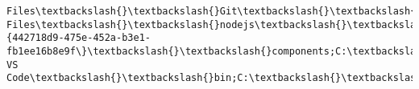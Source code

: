\documentclass[11pt]{article}
\begin{document}
\begin{Verbatim}[commandchars=\\\{\}]
Files\textbackslash{}\textbackslash{}Git\textbackslash{}\textbackslash{}cmd;C:\textbackslash{}\textbackslash{}WINDOWS\textbackslash{}\textbackslash{}System32\textbackslash{}\textbackslash{}OpenSSH\textbackslash{}\textbackslash{};C:\textbackslash{}\textbackslash{}Program Files\textbackslash{}\textbackslash{}nodejs\textbackslash{}\textbackslash{};C:\textbackslash{}\textbackslash{}ProgramData\textbackslash{}\textbackslash{}chocolatey\textbackslash{}\textbackslash{}bin;C:\textbackslash{}\textbackslash{}xampp\textbackslash{}\textbackslash{}php;C:\textbackslash{}\textbackslash{}ProgramData\textbackslash{}\textbackslash{}ComposerSetup\textbackslash{}\textbackslash{}bin;C:\textbackslash{}\textbackslash{}Users\textbackslash{}\textbackslash{}muham\textbackslash{}\textbackslash{}AppData\textbackslash{}\textbackslash{}Local\textbackslash{}\textbackslash{}Microsoft\textbackslash{}\textbackslash{}WindowsApps;C:\textbackslash{}\textbackslash{}Users\textbackslash{}\textbackslash{}muham\textbackslash{}\textbackslash{}AppData\textbackslash{}\textbackslash{}Roaming\textbackslash{}\textbackslash{}Dashlane\textbackslash{}\textbackslash{}4.8.2.33026\textbackslash{}\textbackslash{}bin\textbackslash{}\textbackslash{}Firefox\_Extension\textbackslash{}\textbackslash{}\{442718d9-475e-452a-b3e1-fb1ee16b8e9f\}\textbackslash{}\textbackslash{}components;C:\textbackslash{}\textbackslash{}Users\textbackslash{}\textbackslash{}muham\textbackslash{}\textbackslash{}AppData\textbackslash{}\textbackslash{}Roaming\textbackslash{}\textbackslash{}Dashlane\textbackslash{}\textbackslash{}4.8.2.33026\textbackslash{}\textbackslash{}ucrt;C:\textbackslash{}\textbackslash{}Users\textbackslash{}\textbackslash{}muham\textbackslash{}\textbackslash{}AppData\textbackslash{}\textbackslash{}Local\textbackslash{}\textbackslash{}atom\textbackslash{}\textbackslash{}bin;C:\textbackslash{}\textbackslash{}Users\textbackslash{}\textbackslash{}muham\textbackslash{}\textbackslash{}AppData\textbackslash{}\textbackslash{}Local\textbackslash{}\textbackslash{}GitHubDesktop\textbackslash{}\textbackslash{}bin;C:\textbackslash{}\textbackslash{}Users\textbackslash{}\textbackslash{}muham\textbackslash{}\textbackslash{}AppData\textbackslash{}\textbackslash{}Local\textbackslash{}\textbackslash{}Microsoft\textbackslash{}\textbackslash{}WindowsApps;;C:\textbackslash{}\textbackslash{}Users\textbackslash{}\textbackslash{}muham\textbackslash{}\textbackslash{}AppData\textbackslash{}\textbackslash{}Roaming\textbackslash{}\textbackslash{}npm;C:\textbackslash{}\textbackslash{}Users\textbackslash{}\textbackslash{}muham\textbackslash{}\textbackslash{}AppData\textbackslash{}\textbackslash{}Local\textbackslash{}\textbackslash{}Programs\textbackslash{}\textbackslash{}Microsoft VS Code\textbackslash{}\textbackslash{}bin;C:\textbackslash{}\textbackslash{}Users\textbackslash{}\textbackslash{}muham\textbackslash{}\textbackslash{}AppData\textbackslash{}\textbackslash{}Roaming\textbackslash{}\textbackslash{}Composer\textbackslash{}\textbackslash{}vendor\textbackslash{}\textbackslash{}bin'
\end{Verbatim}
            
\end{document}
